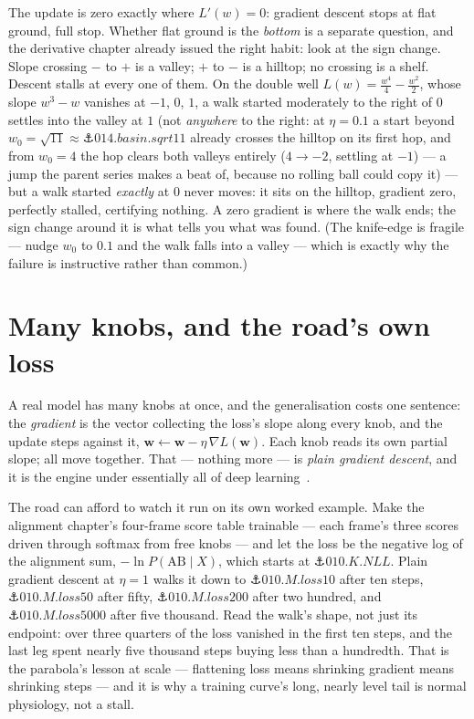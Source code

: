 \begin{narrative}
The update is zero exactly where $L'(w) = 0$: gradient descent stops
at flat ground, full stop. Whether flat ground is the \emph{bottom} is
a separate question, and the derivative chapter already issued the
right habit: look at the sign change. Slope crossing $-$ to $+$ is a
valley; $+$ to $-$ is a hilltop; no crossing is a shelf. Descent
stalls at every one of them. On the double well
$L(w) = \tfrac{w^4}{4} - \tfrac{w^2}{2}$, whose slope $w^3 - w$
vanishes at $-1$, $0$, $1$, a walk started moderately to the right of
$0$ settles into the valley at $1$ (not \emph{anywhere} to the right:
at $\eta = 0.1$ a start beyond $w_0 = \sqrt{11} \approx
\anchor{014.basin.sqrt11}$ already crosses the hilltop on its first
hop, and from $w_0 = 4$ the hop clears both valleys entirely
($4 \to -2$, settling at $-1$) — a jump the parent series makes a
beat of, because no rolling ball could copy it) — but a walk started \emph{exactly} at $0$ never
moves: it sits on the hilltop, gradient zero, perfectly stalled,
certifying nothing. A zero gradient is where the walk ends;
the sign change around it is what tells you what was found. (The
knife-edge is fragile — nudge $w_0$ to $0.1$ and the walk falls into
a valley — which is exactly why the failure is instructive rather
than common.)

\section{Many knobs, and the road's own loss}

A real model has many knobs at once, and the generalisation costs one
sentence: the \emph{gradient} is the vector collecting the loss's
slope along every knob, and the update steps against it,
$\mathbf{w} \leftarrow \mathbf{w} - \eta\,\nabla L(\mathbf{w})$. Each
knob reads its own partial slope; all move together. That — nothing
more — is \emph{plain gradient descent}, and it is the engine under
essentially all of deep
learning~\cite{probability-ian-goodfellow-yoshua-bengio-and-aaron-courville-deep-learni}.

The road can afford to watch it run on its own worked example. Make
the alignment chapter's four-frame score table trainable — each
frame's three scores driven through softmax from free knobs — and let
the loss be the negative log of the alignment sum, $-\ln P(\mathrm{AB}
\mid X)$, which starts at $\anchor{010.K.NLL}$. Plain gradient
descent at $\eta = 1$ walks it down to $\anchor{010.M.loss10}$ after
ten steps, $\anchor{010.M.loss50}$ after fifty,
$\anchor{010.M.loss200}$ after two hundred, and
$\anchor{010.M.loss5000}$ after five thousand. Read the walk's shape,
not just its endpoint: over three quarters of the loss vanished in the
first ten steps, and the last leg spent nearly five thousand steps
buying less than a hundredth. That is the parabola's lesson at scale
— flattening loss means shrinking gradient means shrinking steps —
and it is why a training curve's long, nearly level tail is normal
physiology, not a stall.


\end{narrative}
